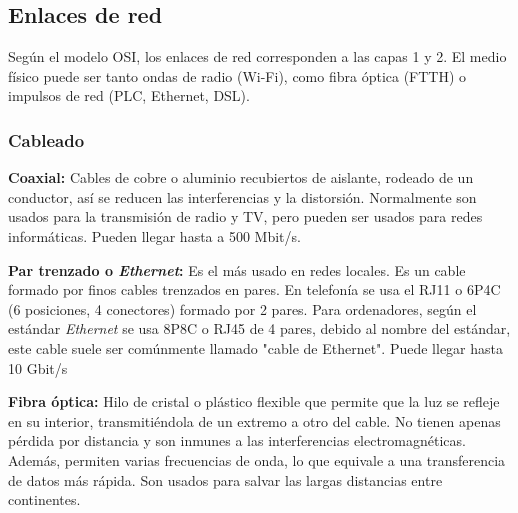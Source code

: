 \subsection{Enlaces de red}
Según el modelo OSI, los enlaces de red corresponden a las capas 1 y 2. El medio físico puede ser tanto ondas de radio (Wi-Fi), como fibra óptica (FTTH) o impulsos de red (PLC, Ethernet, DSL).

\subsubsection{Cableado}
\begin{description}
\item \textbf{Coaxial:} Cables de cobre o aluminio recubiertos de aislante, rodeado de un conductor, así se reducen las interferencias y la distorsión. Normalmente son usados para la transmisión de radio y TV, pero pueden ser usados para redes informáticas. Pueden llegar hasta a 500 Mbit/s.
\item \textbf{Par trenzado o \textit{Ethernet}:} Es el más usado en redes locales. Es un cable formado por finos cables trenzados en pares. En telefonía se usa el RJ11 o 6P4C (6 posiciones, 4 conectores) formado por 2 pares. Para ordenadores, según el estándar \textit{Ethernet} se usa 8P8C o RJ45 de 4 pares, debido al nombre del estándar, este cable suele ser comúnmente llamado "cable de Ethernet". Puede llegar hasta 10 Gbit/s
\item \textbf{Fibra óptica:} Hilo de cristal o plástico flexible que permite que la luz se refleje en su interior, transmitiéndola de un extremo a otro del cable. No tienen apenas pérdida por distancia y son inmunes a las interferencias electromagnéticas. Además, permiten varias frecuencias de onda, lo que equivale a una transferencia de datos más rápida. Son usados para salvar las largas distancias entre continentes.
\end{description}

